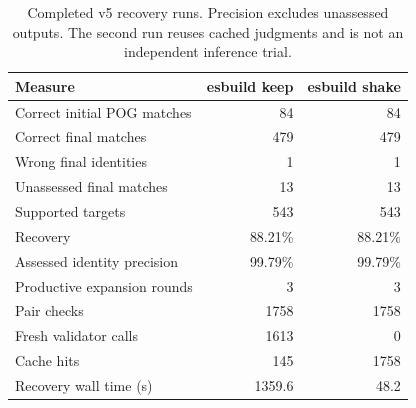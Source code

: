 \begin{table}[t]
\caption{Completed v5 recovery runs. Precision excludes unassessed outputs. The second run reuses cached judgments and is not an independent inference trial.}
\label{tab:completed}
\centering\small
\begin{tabular}{lrr}
\toprule
Measure & esbuild keep & esbuild shake\\
\midrule
Correct initial POG matches & 84 & 84\\
Correct final matches & 479 & 479\\
Wrong final identities & 1 & 1\\
Unassessed final matches & 13 & 13\\
Supported targets & 543 & 543\\
Recovery & 88.21\% & 88.21\%\\
Assessed identity precision & 99.79\% & 99.79\%\\
Productive expansion rounds & 3 & 3\\
Pair checks & 1758 & 1758\\
Fresh validator calls & 1613 & 0\\
Cache hits & 145 & 1758\\
Recovery wall time (s) & 1359.6 & 48.2\\
\bottomrule
\end{tabular}
\end{table}
